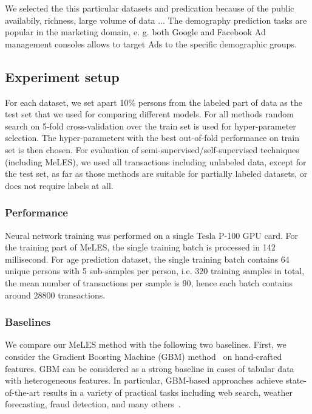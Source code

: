 \documentclass{article}
\begin{document}
We selected the this particular datasets and predication because of the public availabily, richness, large volume of data ... The demography prediction tasks are popular in the marketing domain, e. g. both Google and Facebook Ad management consoles allows to target Ads to the specific demographic groups.

\subsection{Experiment setup}

For each dataset, we set apart 10\% persons from the labeled part of data as the test set that we used for comparing different models.
For all methods random search on 5-fold cross-validation over the train set is used for hyper-parameter selection. The hyper-parameters with the best out-of-fold performance on train set is then chosen.
For evaluation of semi-supervised/self-supervised techniques (including MeLES), we used all transactions including unlabeled data, except for the test set, as far as those methods are suitable for partially labeled datasets, or does not require labels at all.

\subsubsection{Performance}

Neural network training was performed on a single Tesla P-100 GPU card. For the training part of MeLES, the single training batch is processed in 142 millisecond. For age prediction dataset, the single training batch contains 64 unique persons with 5 sub-samples per person, i.e. 320 training samples in total, the mean number of transactions per sample is 90, hence each batch contains around 28800 transactions.

\subsubsection{Baselines} \label{sec-baselines}

We compare our MeLES method with the following two baselines. First, we consider the Gradient Boosting Machine (GBM) method~\cite{Friedman2001GreedyFA} on hand-crafted features. GBM can be considered as a strong baseline in cases of tabular data with heterogeneous features. In particular, GBM-based approaches achieve state-of-the-art results in a variety of practical tasks including web search, weather forecasting, fraud detection, and many others~\cite{Wu2009AdaptingBF, Vorobev2019LearningTS, Zhang2015AGB, Niu2019ACS}.
\end{document}
